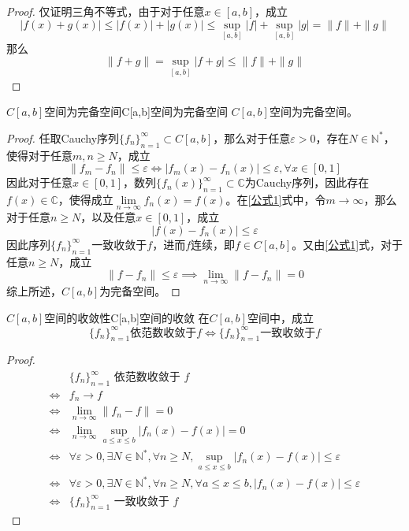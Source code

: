 \documentclass[lang = cn, scheme = chinese, thmcnt = section]{elegantbook}
\newcommand{\N}{\mathbb{N}}            %
\newcommand{\C}{\mathbb{C}}  		   %
\newcommand{\sub}{\subset}             %
\begin{document}
\begin{proof}
	仅证明三角不等式，由于对于任意$x\in [a,b]$，成立
	$$
	|f(x)+g(x)|\le |f(x)|+|g(x)|
	\le \sup_{[a,b]}|f|+\sup_{[a,b]}|g|
	= \|f\|+\|g\|
	$$
	那么
	$$
	\|f+g\|=\sup_{[a,b]}|f+g|\le \|f\|+\|g\|
	$$
\end{proof}

\begin{proposition}{$C[a,b]$空间为完备空间}{C[a,b]空间为完备空间}
	$C[a,b]$空间为完备空间。
\end{proposition}

\begin{proof}
	任取Cauchy序列$\{ f_n \}_{n=1}^{\infty}\sub C[a,b]$，那么对于任意$\varepsilon>0$，存在$N\in\N^*$，使得对于任意$m,n\ge N$，成立
	\begin{equation}
		\label{公式1}\|f_m-f_n\|\le\varepsilon\iff |f_m(x)-f_n(x)|\le\varepsilon,\forall x\in[0,1]\tag*{(*)}
	\end{equation}
	因此对于任意$x\in[0,1]$，数列$\{ f_n(x) \}_{n=1}^{\infty}\sub\C$为Cauchy序列，因此存在$f(x)\in\C$，使得成立$\lim\limits_{n\to\infty}f_n(x)=f(x)$。在\ref{公式1}式中，令$m\to\infty$，那么对于任意$n\ge N$，以及任意$x\in[0,1]$，成立
	$$
	|f(x)-f_n(x)|\le\varepsilon
	$$
	因此序列$\{ f_n \}_{n=1}^{\infty}$一致收敛于$f$，进而$f$连续，即$f\in C[a,b]$。又由\ref{公式1}式，对于任意$n\ge N$​，成立
	$$
	\|f-f_n\|\le\varepsilon\implies \lim_{n\to\infty}\|f-f_n\|=0
	$$
	综上所述，$C[a,b]$为完备空间。
\end{proof}

\begin{proposition}{$C[a,b]$空间的收敛性}{C[a,b]空间的收敛}
	在$C[a,b]$空间中，成立
	$$
	\{f_n\}_{n=1}^{\infty}\text{依范数}\text{收敛于}f\iff \{f_n\}_{n=1}^{\infty}\text{一致收敛于}f
	$$
\end{proposition}

\begin{proof}
	\begin{align*}
		& \{ f_n \}_{n=1}^{\infty}\text{ 依范数收敛于 }f\\
		\iff & f_n\longrightarrow f\\
		\iff & \lim_{n\to\infty}\| f_n-f \|=0\\
		\iff & \lim_{n\to\infty}\sup_{a\le x\le b}|f_n(x)-f(x)|=0\\
		\iff & \forall\varepsilon>0,\exists N\in\N^*,\forall n\ge N,\sup_{a\le x\le b}|f_n(x)-f(x)|\le\varepsilon\\
		\iff & \forall\varepsilon>0,\exists N\in\N^*,\forall n\ge N,\forall a\le x\le b,|f_n(x)-f(x)|\le\varepsilon\\
		\iff & \{ f_n \}_{n=1}^{\infty}\text{ 一致收敛于 }f
	\end{align*}
\end{proof}
\end{document}
